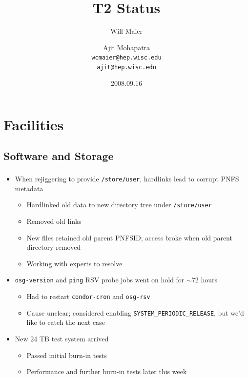 \documentclass{beamer}
\title{T2 Status}
\author[Maier, Mohapatra]{
    Will Maier \and Ajit Mohapatra\\ 
    {\tt wcmaier@hep.wisc.edu}\\
    {\tt ajit@hep.wisc.edu}}
\institute[Wisconsin]{University of Wisconsin - High Energy Physics}
\date{2008.09.16}
\newcommand{\ca}{\ensuremath{\sim}}
\begin{document}
\begin{frame}
    \titlepage
\end{frame}


\section{Facilities}
\subsection{Software and Storage}
\begin{frame}
\frametitle{}
\begin{itemize}
    \item When rejiggering to provide {\tt /store/user}, hardlinks lead to corrupt PNFS metadata
    \begin{itemize}
        \item Hardlinked old data to new directory tree under {\tt /store/user}
        \item Removed old links
        \item New files retained old parent PNFSID; access broke when old parent directory removed
        \item Working with experts to resolve
    \end{itemize}
    \item {\tt osg-version} and {\tt ping} RSV probe jobs went on hold for \ca{}72 hours
    \begin{itemize}
        \item Had to restart {\tt condor-cron} and {\tt osg-rsv}
        \item Cause unclear; considered enabling {\tt SYSTEM\_PERIODIC\_RELEASE}, but we'd like to catch the next case
    \end{itemize}
    \item New 24 TB test system arrived
    \begin{itemize}
        \item Passed initial burn-in tests
        \item Performance and further burn-in tests later this week
    \end{itemize}
\end{itemize}
\end{frame}
\end{document}
